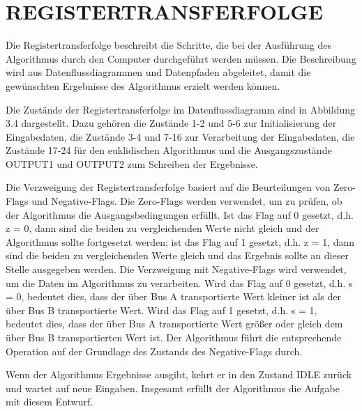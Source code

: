 \section{REGISTERTRANSFERFOLGE}

Die Registertransferfolge beschreibt die Schritte, die bei der Ausführung des Algorithmus durch den Computer durchgeführt werden müssen. Die Beschreibung wird aus Datenflussdiagrammen und Datenpfaden abgeleitet, damit die gewünschten Ergebnisse des Algorithmus erzielt werden können.

\vspace{\baselineskip}

\noindent Die Zustände der Registertransferfolge im Datenflussdiagramm sind in Abbildung 3.4 dargestellt. Dazu gehören die Zustände 1-2 und 5-6 zur Initialisierung der Eingabedaten, die Zustände 3-4 und 7-16 zur Verarbeitung der Eingabedaten, die Zustände 17-24 für den euklidischen Algorithmus und die Ausgangszustände OUTPUT1 und OUTPUT2 zum Schreiben der Ergebnisse.

\vspace{\baselineskip}

\noindent Die Verzweigung der Registertransferfolge basiert auf die Beurteilungen von Zero-Flags und Negative-Flags. Die Zero-Flags werden verwendet, um zu prüfen, ob der Algorithmus die Ausgangsbedingungen erfüllt. Ist das Flag auf 0 gesetzt, d.h. z = 0, dann sind die beiden zu vergleichenden Werte nicht gleich und der Algorithmus sollte fortgesetzt werden; ist das Flag auf 1 gesetzt, d.h. z = 1, dann sind die beiden zu vergleichenden Werte gleich und das Ergebnis sollte an dieser Stelle ausgegeben werden. Die Verzweigung mit Negative-Flags wird verwendet, um die Daten im Algorithmus zu verarbeiten. Wird das Flag auf 0 gesetzt, d.h. s = 0, bedeutet dies, dass der über Bus A transportierte Wert kleiner ist als der über Bus B transportierte Wert. Wird das Flag auf 1 gesetzt, d.h. s = 1, bedeutet dies, dass der über Bus A transportierte Wert größer oder gleich dem über Bus B transportierten Wert ist. Der Algorithmus führt die entsprechende Operation auf der Grundlage des Zustands des Negative-Flags durch.

\vspace{\baselineskip}

\noindent Wenn der Algorithmus Ergebnisse ausgibt, kehrt er in den Zustand IDLE zurück und wartet auf neue Eingaben. Insgesamt erfüllt der Algorithmus die Aufgabe mit diesem Entwurf.

